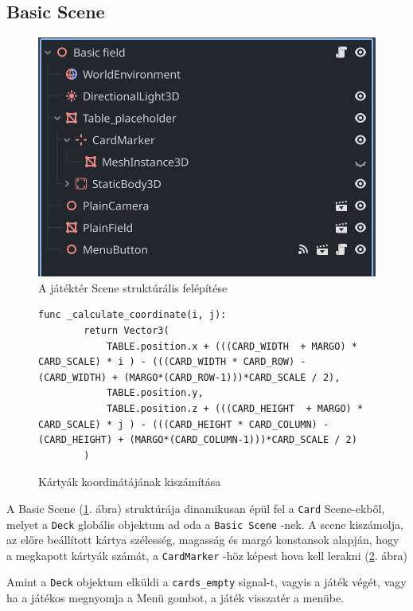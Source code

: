 \subsection{Basic Scene}
\begin{figure}
    \centering
    \includegraphics[width=\textwidth]{img/basic_field_scene_structure.png}
    \caption{A játéktér Scene struktúrális felépítése}
    \label{img:basic_scene}  
\end{figure}
\begin{figure}
    \centering
    \begin{lstlisting}[language=GDScript]
        func _calculate_coordinate(i, j):
        return Vector3(
            TABLE.position.x + (((CARD_WIDTH  + MARGO) * CARD_SCALE) * i ) - (((CARD_WIDTH * CARD_ROW) - (CARD_WIDTH) + (MARGO*(CARD_ROW-1)))*CARD_SCALE / 2),
            TABLE.position.y,
            TABLE.position.z + (((CARD_HEIGHT  + MARGO) * CARD_SCALE) * j ) - (((CARD_HEIGHT * CARD_COLUMN) - (CARD_HEIGHT) + (MARGO*(CARD_COLUMN-1)))*CARD_SCALE / 2)
        )
    \end{lstlisting}
    \caption{Kártyák koordinátájának kiszámítása}
    \label{code:calculate_coordinate}
\end{figure}
A Basic Scene (\ref{img:basic_scene}. ábra) struktúrája dinamikusan épül fel a \lstinline{Card} Scene-ekből, melyet a \lstinline|Deck| globális objektum ad oda a \lstinline|Basic Scene| -nek. A scene kiszámolja, az előre beállított kártya szélesség, magasság és margó konstansok alapján, hogy a megkapott kártyák számát, a \lstinline|CardMarker| -höz képest hova kell lerakni (\ref{code:calculate_coordinate}. ábra)

Amint a \lstinline|Deck| objektum elküldi a \lstinline{cards_empty} signal-t, vagyis a játék végét, vagy ha a játékos megnyomja a Menü gombot, a játék visszatér a menübe. 

